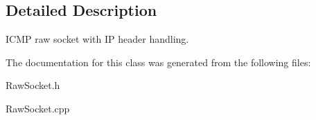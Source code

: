 \subsection{Detailed Description}
ICMP raw socket with IP header handling. 

The documentation for this class was generated from the following files:\begin{CompactItemize}
\item 
RawSocket.h\item 
RawSocket.cpp\end{CompactItemize}

